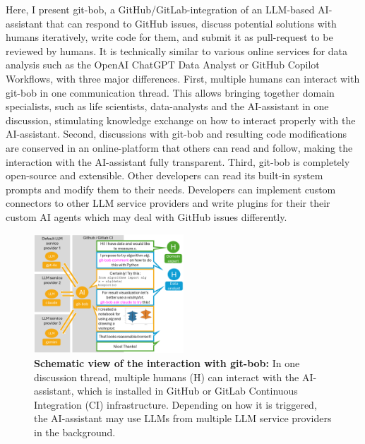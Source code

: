 \documentclass[sn-mathphys-num]{sn-jnl}%
\theoremstyle{thmstyleone}%
\theoremstyle{thmstyletwo}%
\theoremstyle{thmstylethree}%
\begin{document}
Here, I present git-bob, a GitHub/GitLab-integration of an LLM-based AI-assistant that can respond to GitHub issues, discuss potential solutions with humans iteratively, write code for them, and submit it as pull-request to be reviewed by humans. It is technically similar to various online services for data analysis such as the OpenAI ChatGPT Data Analyst or GitHub Copilot Workflows, with three major differences. First, multiple humans can interact with git-bob in one communication thread. This allows bringing together domain specialists, such as life scientists, data-analysts and the AI-assistant in one discussion, stimulating knowledge exchange on how to interact properly with the AI-assistant. Second, discussions with git-bob and resulting code modifications are conserved in an online-platform that others can read and follow, making the interaction with the AI-assistant fully transparent. Third, git-bob is completely open-source and extensible. Other developers can read its built-in system prompts and modify them to their needs. Developers can implement custom connectors to other LLM service providers and write plugins for their their custom AI agents which may deal with GitHub issues differently.


\begin{figure}[h]
\centering
\includegraphics[width=0.5\textwidth]{fig1_scheme.png}
\caption{\textbf{Schematic view of the interaction with git-bob:} In one discussion thread, multiple humans (H) can interact with the AI-assistant, which is installed in GitHub or GitLab Continuous Integration (CI) infrastructure. Depending on how it is triggered, the AI-assistant may use LLMs from multiple LLM service providers in the background.
\newline
\newline
}
\label{fig:example_interaction}
\end{figure}
\end{document}
